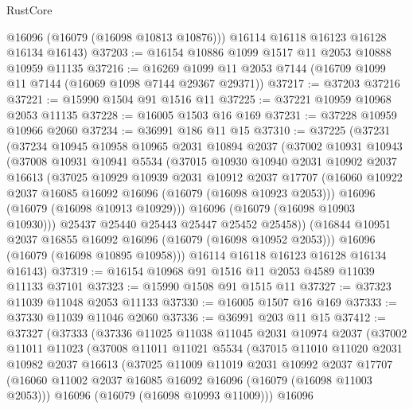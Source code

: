 \begin{lexlean}{RustCore}
\begin{coremodule}
        @16096
        (@16079 (@16098 @10813 @10876)))
      @16114
      @16118
      @16123
      @16128
      @16134
      @16143)
@37203 := @16154 @10886 @1099 @1517 @11 @2053 @10888 @10959 @11135
@37216 := @16269 @1099 @11 @2053 @7144 (@16709 @1099 @11 @7144 (@16069 @1098 @7144 @29367 @29371))
@37217 := @37203 @37216
@37221 := @15990 @1504 @91 @1516 @11
@37225 := @37221 @10959 @10968 @2053 @11135
@37228 := @16005 @1503 @16 @169
@37231 := @37228 @10959 @10966 @2060
@37234 := @36991 @186 @11 @15
@37310 := @37225
    (@37231
      (@37234
        @10945
        @10958
        @10965
        @2031
        @10894
        @2037
        (@37002
          @10931
          @10943
          (@37008
            @10931
            @10941
            @5534
            (@37015
              @10930
              @10940
              @2031
              @10902
              @2037
              @16613
              (@37025
                @10929
                @10939
                @2031
                @10912
                @2037
                @17707
                (@16060 @10922 @2037 @16085 @16092 @16096 (@16079 (@16098 @10923 @2053)))
                @16096
                (@16079 (@16098 @10913 @10929)))
              @16096
              (@16079 (@16098 @10903 @10930)))
            @25437
            @25440
            @25443
            @25447
            @25452
            @25458))
        (@16844 @10951 @2037 @16855 @16092 @16096 (@16079 (@16098 @10952 @2053)))
        @16096
        (@16079 (@16098 @10895 @10958)))
      @16114
      @16118
      @16123
      @16128
      @16134
      @16143)
@37319 := @16154 @10968 @91 @1516 @11 @2053 @4589 @11039 @11133 @37101
@37323 := @15990 @1508 @91 @1515 @11
@37327 := @37323 @11039 @11048 @2053 @11133
@37330 := @16005 @1507 @16 @169
@37333 := @37330 @11039 @11046 @2060
@37336 := @36991 @203 @11 @15
@37412 := @37327
    (@37333
      (@37336
        @11025
        @11038
        @11045
        @2031
        @10974
        @2037
        (@37002
          @11011
          @11023
          (@37008
            @11011
            @11021
            @5534
            (@37015
              @11010
              @11020
              @2031
              @10982
              @2037
              @16613
              (@37025
                @11009
                @11019
                @2031
                @10992
                @2037
                @17707
                (@16060 @11002 @2037 @16085 @16092 @16096 (@16079 (@16098 @11003 @2053)))
                @16096
                (@16079 (@16098 @10993 @11009)))
              @16096

\end{coremodule}
\end{lexlean}
